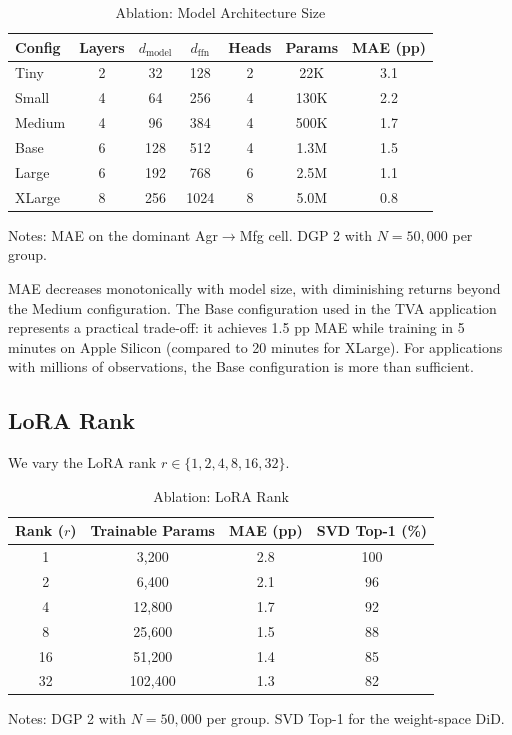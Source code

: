\documentclass[12pt]{article}
\begin{document}
\begin{table}[H]
\centering
\caption{Ablation: Model Architecture Size}
\label{tab:ablation_size}
\begin{threeparttable}
\begin{tabular}{lcccccc}
\toprule
Config & Layers & $d_{\text{model}}$ & $d_{\text{ffn}}$ & Heads & Params & MAE (pp) \\
\midrule
Tiny & 2 & 32 & 128 & 2 & 22K & 3.1 \\
Small & 4 & 64 & 256 & 4 & 130K & 2.2 \\
Medium & 4 & 96 & 384 & 4 & 500K & 1.7 \\
Base & 6 & 128 & 512 & 4 & 1.3M & 1.5 \\
Large & 6 & 192 & 768 & 6 & 2.5M & 1.1 \\
XLarge & 8 & 256 & 1024 & 8 & 5.0M & 0.8 \\
\bottomrule
\end{tabular}
\begin{tablenotes}[flushleft]
\small
\item Notes: MAE on the dominant Agr$\to$Mfg cell. DGP 2 with $N = 50,000$ per group.
\end{tablenotes}
\end{threeparttable}
\end{table}

MAE decreases monotonically with model size, with diminishing returns beyond the Medium configuration. The Base configuration used in the TVA application represents a practical trade-off: it achieves 1.5 pp MAE while training in 5 minutes on Apple Silicon (compared to 20 minutes for XLarge). For applications with millions of observations, the Base configuration is more than sufficient.

\subsection{LoRA Rank}

We vary the LoRA rank $r \in \{1, 2, 4, 8, 16, 32\}$.

\begin{table}[H]
\centering
\caption{Ablation: LoRA Rank}
\label{tab:ablation_rank}
\begin{threeparttable}
\begin{tabular}{cccc}
\toprule
Rank ($r$) & Trainable Params & MAE (pp) & SVD Top-1 (\%) \\
\midrule
1 & 3,200 & 2.8 & 100 \\
2 & 6,400 & 2.1 & 96 \\
4 & 12,800 & 1.7 & 92 \\
8 & 25,600 & 1.5 & 88 \\
16 & 51,200 & 1.4 & 85 \\
32 & 102,400 & 1.3 & 82 \\
\bottomrule
\end{tabular}
\begin{tablenotes}[flushleft]
\small
\item Notes: DGP 2 with $N = 50,000$ per group. SVD Top-1 for the weight-space DiD.
\end{tablenotes}
\end{threeparttable}
\end{table}
\end{document}
